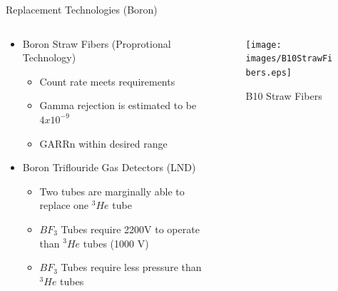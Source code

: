 \documentclass{beamer}
\begin{document}
\begin{frame}{Replacement Technologies (Boron)}
\begin{columns}[onlytextwidth]
\begin{column}{0.45\textwidth}
\begin{itemize}
	\small
	\item Boron Straw Fibers (Proprotional Technology) \cite{kouzes_boron-lined_2012}
	\begin{itemize}
		\tiny
		\item Count rate meets requirements
		\item Gamma rejection is estimated to be $4x10^{-9}$
		\item GARRn within desired range
	\end{itemize}
	\small
	\item Boron Triflouride Gas Detectors (LND) \cite{kouzes_bf3_2009}
	\begin{itemize}
		\tiny
		\item Two tubes are marginally able to replace one ${}^3He$ tube
		\item $BF_3$ Tubes require 2200V to operate than ${}^3He$ tubes (1000 V)
		\item $BF_3$ Tubes require less pressure than ${}^3He$ tubes
	\end{itemize}
\end{itemize}
\end{column}
\begin{column}{0.45\textwidth}
	\begin{figure}
	\centering
		\texttt{[image: images/B10StrawFibers.eps]}
		\caption{B10 Straw Fibers}
		\label{fig:B10StrawFibers}

\end{figure}
\end{column}
\end{columns}
\end{frame}
\end{document}
